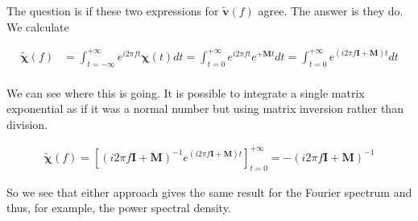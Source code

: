 \documentclass[12pt]{article}
\newcommand{\bv}[1]{\mathbf{#1}}
\begin{document}
The question is if these two expressions for $\tilde{\bv{v}}(f)$ agree. The answer is they do. We calculate 

\begin{align}
\tilde{\boldsymbol{\chi}}(f) &= \int_{t=-\infty}^{+\infty} e^{i 2\pi f t}\boldsymbol{\chi}(t) dt = \int_{t=0}^{+\infty} e^{i2\pi f t} e^{+\bv{M} t} dt = \int_{t=0}^{+\infty} e^{(i 2\pi f \bv{I} + \bv{M})t} dt \\
\end{align}

We can see where this is going. It is possible to integrate a single matrix exponential as if it was a normal number but using matrix inversion rather than division.

\begin{align}
\tilde{\boldsymbol{\chi}}(f) = \left[(i 2\pi f \bv{I} + \bv{M})^{-1} e^{(i 2\pi f \bv{I} + \bv{M})t}\right]_{t=0}^{+\infty} = -(i2\pi f \bv{I} + \bv{M})^{-1}
\end{align}

So we see that either approach gives the same result for the Fourier spectrum and thus, for example, the power spectral density.
\end{document}
